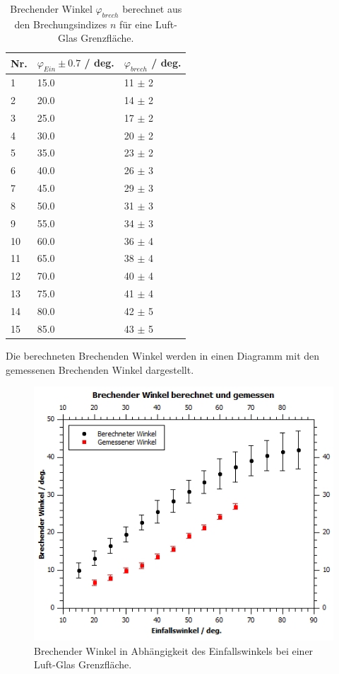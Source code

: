 \documentclass[12pt,a4paper,twoside]{article}
\begin{document}
\begin{table}[H]
    \centering
    \caption{Brechender Winkel $\varphi_{brech}$ berechnet aus den Brechungsindizes $n$ für eine Luft-Glas Grenzfläche. }
    \label{tab:brechender winkel berechnet}
    \begin{tabular}{| l | l | l |}
        \hline
        Nr. & $\varphi_{Ein} \pm 0.7$ / deg.  & $\varphi_{brech}$ / deg.   \\
        \hline
        1  & 15.0  & 11 $\pm$  2 \\ %
        2  & 20.0  & 14 $\pm$  2 \\ %
        3  & 25.0  & 17 $\pm$  2 \\ %
        4  & 30.0  & 20 $\pm$  2 \\ %
        5  & 35.0  & 23 $\pm$  2 \\ %
        6  & 40.0  & 26 $\pm$  3 \\ %
        7  & 45.0  & 29 $\pm$  3 \\ %
        8  & 50.0  & 31 $\pm$  3 \\ %
        9  & 55.0  & 34 $\pm$  3 \\ %
        10 & 60.0  & 36 $\pm$  4 \\ %
        11 & 65.0  & 38 $\pm$  4 \\ %
        12 & 70.0  & 40 $\pm$  4 \\ %
        13 & 75.0  & 41 $\pm$  4 \\ %
        14 & 80.0  & 42 $\pm$  5 \\ %
        15 & 85.0  & 43 $\pm$  5 \\ %
        \hline
    \end{tabular}
\end{table}

\noindent
Die berechneten Brechenden Winkel werden in einen Diagramm mit den gemessenen Brechenden Winkel dargestellt. 

\begin{figure}[H]
    \centering
    \includegraphics[width=0.6\linewidth]{nudes/brechender winkel.jpg}
    \caption{Brechender Winkel in Abhängigkeit des Einfallswinkels bei einer Luft-Glas Grenzfläche. }
    \label{fig:brechender winkel}
\end{figure}
\end{document}
